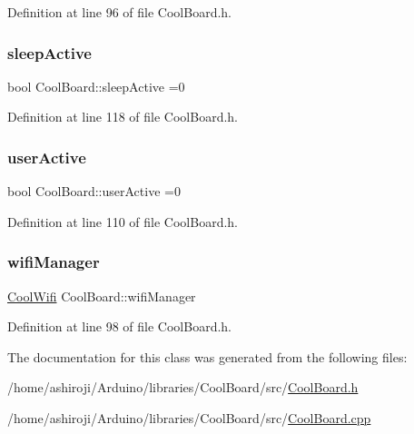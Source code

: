 Definition at line 96 of file Cool\+Board.\+h.

\mbox{\label{class_cool_board_a0a51b2287139f66c738101fb53139230}} 
\subsubsection{\texorpdfstring{sleep\+Active}{sleepActive}}
{\footnotesize\ttfamily bool Cool\+Board\+::sleep\+Active =0\hspace{0.3cm}{\ttfamily [private]}}



Definition at line 118 of file Cool\+Board.\+h.

\mbox{\label{class_cool_board_a6395459131d6889a3005f79c7a35e964}} 
\subsubsection{\texorpdfstring{user\+Active}{userActive}}
{\footnotesize\ttfamily bool Cool\+Board\+::user\+Active =0\hspace{0.3cm}{\ttfamily [private]}}



Definition at line 110 of file Cool\+Board.\+h.

\mbox{\label{class_cool_board_acd88e6003606b47479ebba81e4aceeca}} 
\subsubsection{\texorpdfstring{wifi\+Manager}{wifiManager}}
{\footnotesize\ttfamily \hyperlink{class_cool_wifi}{Cool\+Wifi} Cool\+Board\+::wifi\+Manager\hspace{0.3cm}{\ttfamily [private]}}



Definition at line 98 of file Cool\+Board.\+h.



The documentation for this class was generated from the following files\+:\begin{DoxyCompactItemize}
\item 
/home/ashiroji/\+Arduino/libraries/\+Cool\+Board/src/\hyperlink{_cool_board_8h}{Cool\+Board.\+h}\item 
/home/ashiroji/\+Arduino/libraries/\+Cool\+Board/src/\hyperlink{_cool_board_8cpp}{Cool\+Board.\+cpp}\end{DoxyCompactItemize}
